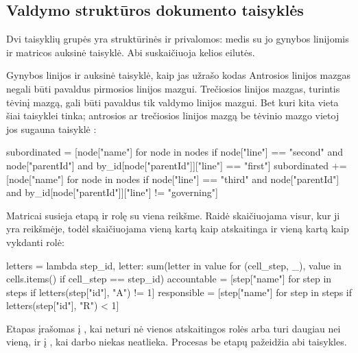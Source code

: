 \subsection{Valdymo struktūros dokumento taisyklės}

Dvi taisyklių grupės yra struktūrinės ir privalomos: medis su jo gynybos linijomis ir matricos
auksinė taisyklė. Abi suskaičiuoja kelios  eilutės.

\begin{codebox}{Gynybos linijos ir auksinė taisyklė, kaip jas užrašo kodas}
Antrosios linijos mazgas negali būti pavaldus pirmosios linijos mazgui. Trečiosios linijos
mazgas, turintis tėvinį mazgą, gali būti pavaldus tik valdymo linijos mazgui. Bet kuri kita
vieta šiai taisyklei tinka; antrosios ar trečiosios linijos mazgą be tėvinio mazgo vietoj jos
sugauna taisyklė :

\begin{codeblock}
subordinated = [node["name"] for node in nodes if node["line"] == "second" and node["parentId"]
                and by_id[node["parentId"]]["line"] == "first"]
subordinated += [node["name"] for node in nodes if node["line"] == "third" and node["parentId"]
                 and by_id[node["parentId"]]["line"] != "governing"]
\end{codeblock}

Matricai  susieja etapą ir rolę su viena reikšme. Raidė skaičiuojama visur, kur ji
yra reikšmėje, todėl  skaičiuojama vieną kartą kaip atskaitinga ir vieną kartą kaip
vykdanti rolė:

\begin{codeblock}
letters = lambda step_id, letter: sum(letter in value for (cell_step, _), value in cells.items() if cell_step == step_id)
accountable = [step["name"] for step in steps if letters(step["id"], "A") != 1]
responsible = [step["name"] for step in steps if letters(step["id"], "R") < 1]
\end{codeblock}

Etapas įrašomas į , kai neturi nė vienos atskaitingos rolės arba turi
daugiau nei vieną, ir į , kai darbo niekas neatlieka. Procesas be etapų
pažeidžia abi taisykles.
\end{codebox}

